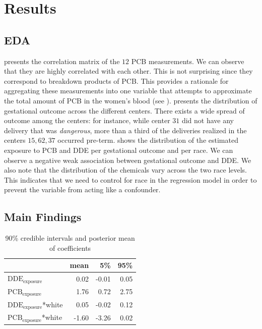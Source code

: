 \documentclass[wcp]{jmlr}%
\begin{document}
\section{Results}
\label{sec:results}

\subsection{EDA}

 presents the correlation matrix of the $12$ PCB measurements. We can observe that they are highly correlated with each other. This is not surprising since they correspond to breakdown products of PCB. This provides a rationale for aggregating these measurements into one variable that attempts to approximate the total amount of PCB in the women's blood (see ).  presents the distribution of gestational outcome across the different centers. There exists a wide spread of outcome among the centers: for instance, while center $31$ did not have any delivery that was \textit{dangerous}, more than a third of the deliveries realized in the centers $15, 62, 37$ occurred pre-term.  shows the distribution of the estimated exposure to PCB and DDE per gestational outcome and per race. We can observe a negative weak association between gestational outcome and DDE. We also note that the distribution of the chemicals vary across the two race levels. This indicates that we need to control for race in the regression model in order to prevent the variable from acting like a confounder.


\subsection{Main Findings}

\begin{table}
	\centering
	\begin{tabular}{lrrr}
		\toprule
		& mean & 5\% & 95\%\\
		\midrule
		$\text{DDE}_{\text{exposure}}$ & 0.02 & -0.01 & 0.05\\
		$\text{PCB}_{\text{exposure}}$& 1.76 & 0.72 & 2.75\\
		$\text{DDE}_{\text{exposure}}$*white & 0.05 & -0.02 & 0.12\\
		$\text{PCB}_{\text{exposure}}$*white & -1.60 & -3.26 & 0.02\\
		\bottomrule
	\end{tabular}
	\caption{\label{tab:confints} 90\% credible intervals and posterior mean of coefficients}
\end{table}
\end{document}
